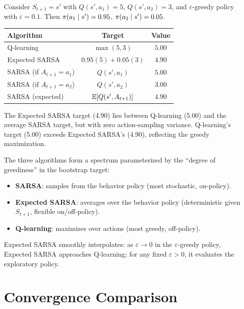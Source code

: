 \documentclass[11pt,a4paper]{article}
\begin{document}
\begin{example}
\label{ex:unified}
Consider $S_{t+1} = s'$ with $Q(s', a_1) = 5$,
$Q(s', a_2) = 3$, and $\varepsilon$-greedy policy with
$\varepsilon = 0.1$. Then $\pi(a_1 \mid s') = 0.95$,
$\pi(a_2 \mid s') = 0.05$.

\begin{center}
\begin{tabular}{lcc}
\toprule
\textbf{Algorithm} & \textbf{Target} & \textbf{Value} \\
\midrule
Q-learning & $\max(5, 3)$ & $5.00$ \\
Expected SARSA & $0.95(5) + 0.05(3)$ & $4.90$ \\
SARSA (if $A_{t+1} = a_1$) & $Q(s', a_1)$ & $5.00$ \\
SARSA (if $A_{t+1} = a_2$) & $Q(s', a_2)$ & $3.00$ \\
\midrule
SARSA (expected) & $\mathbb{E}[Q(s', A_{t+1})]$ & $4.90$ \\
\bottomrule
\end{tabular}
\end{center}
The Expected SARSA target (4.90) lies between Q-learning (5.00)
and the average SARSA target, but with zero action-sampling
variance. Q-learning's target (5.00) exceeds Expected SARSA's
(4.90), reflecting the greedy maximization.
\end{example}

\begin{remark}
\label{rem:continuum}
The three algorithms form a spectrum parameterized by the ``degree
of greediness'' in the bootstrap target:
\begin{itemize}[nosep]
  \item \textbf{SARSA}: samples from the behavior policy
    (most stochastic, on-policy).
  \item \textbf{Expected SARSA}: averages over the behavior policy
    (deterministic given $S_{t+1}$, flexible on/off-policy).
  \item \textbf{Q-learning}: maximizes over actions
    (most greedy, off-policy).
\end{itemize}
Expected SARSA smoothly interpolates: as $\varepsilon \to 0$ in the
$\varepsilon$-greedy policy, Expected SARSA approaches Q-learning;
for any fixed $\varepsilon > 0$, it evaluates the exploratory policy.
\end{remark}

\section{Convergence Comparison}
\label{sec:comparison}
\end{document}
